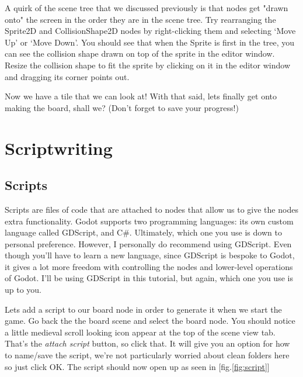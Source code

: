 \documentclass[14pt]{extarticle}
\newcommand{\prettyref}[2]{[{#1}.\ref{#2}]}
\begin{document}
A quirk of the scene tree that we discussed previously is that nodes get "drawn onto" the screen in the order they are in the scene tree. Try rearranging the Sprite2D and CollisionShape2D nodes by right-clicking them and selecting `Move Up' or `Move Down'. You should see that when the Sprite is first in the tree, you can see the collision shape drawn on top of the sprite in the editor window. Resize the collision shape to fit the sprite by clicking on it in the editor window and dragging its corner points out.

Now we have a tile that we can look at! With that said, lets finally get onto making the board, shall we? (Don't forget to save your progress!)

\newpage

\section{Scriptwriting}
\subsection*{Scripts}
Scripts are files of code that are attached to nodes that allow us to give the nodes extra functionality. Godot supports two programming languages: its own custom language called GDScript, and C\#. Ultimately, which one you use is down to personal preference. However, I personally do recommend using GDScript. Even though you'll have to learn a new language, since GDScript is bespoke to Godot, it gives a lot more freedom with controlling the nodes and lower-level operations of Godot. I'll be using GDScript in this tutorial, but again, which one you use is up to you.

Lets add a script to our board node in order to generate it when we start the game. Go back the the board scene and select the board node. You should notice a little medieval scroll looking icon appear at the top of the scene view tab. That's the \textit{attach script} button, so click that. It will give you an option for how to name/save the script, we're not particularly worried about clean folders here so just click OK. The script should now open up as seen in \prettyref{fig}{fig:script}

\end{document}
